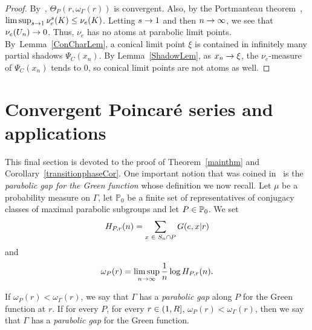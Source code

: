 \documentclass[AHL,Unicode,longabstracts]{cedram}
\newcommand{\bbP}{\mathbb{P}}
\let\oldin\in
\renewcommand{\in}{\mathchoice{\oldin}{\oldin}{\,\oldin\,}{\,\oldin\,}}
\renewcommand*{\to}{\mathchoice{\longrightarrow}{\rightarrow}{\rightarrow}{\rightarrow}}
\begin{document}
\begin{proof}
By~\cite[Corollary~3.9]{DWY}, $\Theta_P(r,\omega_\Gamma(r))$ is convergent. Also, by the Portmanteau theorem~\cite[Theorem~2.1]{Bill99}, $\limsup_{s\to 1}\nu_e^s(K)\leq \nu_e(K)$. Letting $s\to 1$ and then $n\to\infty$, we see that $\nu_e(U_n)\to 0$. Thus, $\nu_e$ has no atoms at parabolic limit points. By~Lemma~\ref{ConCharLem}, a conical limit point $\xi$ is contained in infinitely many partial shadows $\Psi_{C}(x_n)$. By Lemma~\ref{ShadowLem}, as $x_n\to \xi$, the $\nu_e$-measure of $\Psi_C(x_n)$ tends to $0$, so conical limit points are not atoms as well.
\end{proof}


\section{Convergent Poincaré series and applications}
\label{SectionRHG}

This final section is devoted to the proof of Theorem~\ref{mainthm} and Corollary~\ref{transitionphaseCor}. One important notion that was coined in~\cite{DWY} is the \emph{parabolic gap for the Green function} whose definition we now recall. Let $\mu$ be a probability measure on $\Gamma$, let $\bbP_0$ be a finite set of representatives of conjugacy classes of maximal parabolic subgroups and let $P\in \bbP_0$. We set
\[
H_{P,r}(n)=\sum_{x\in S_n\cap P}G(e,x|r)
\]
and
\[
\omega_P(r)=\limsup_{n\to \infty}\frac{1}{n}\log H_{P,r}(n).
\]
\begin{defi}
If $\omega_P(r)<\omega_\Gamma(r)$, we say that $\Gamma$ has a \emph{parabolic gap} along $P$ for the Green function at $r$. If for every $P$, for every $r\in (1,R]$, $\omega_P(r)<\omega_\Gamma(r)$, then we say that $\Gamma$ has a \emph{parabolic gap} for the Green function.
\end{defi}
\end{document}
